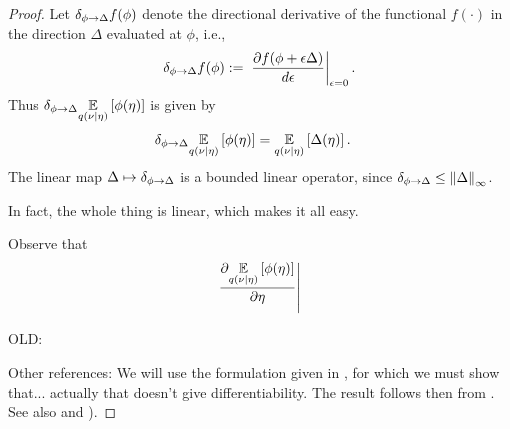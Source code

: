 \begin{thm}
\begin{proof}
Let $\delta_{\phi\rightarrow\Delta} f(\phi)$ denote the directional derivative of the functional
$f(\cdot)$ in the direction $\Delta$ evaluated at $\phi$, i.e.,
%
\begin{align*}
%
\dirderiv{\phi}{\Delta} f(\phi) :={}
\fracat{\partial f(\phi + \epsilon \Delta)}{d\epsilon}{\epsilon=0}.
%
\end{align*}
%
Thus $\delta_{\phi\rightarrow\Delta} \underset{q(\nu \vert \eta)}{\mathbb{E}}\left[\phi(\eta)\right]$
is given by
%
\begin{align*}
%
\dirderiv{\phi}{\Delta} \expect{\q(\nu \vert \eta)}{\phi(\eta)} ={}&
    \expect{\q(\nu \vert \eta)}{\Delta(\eta)}.
%
\end{align*}
%
The linear map $\Delta \mapsto \delta_{\phi\rightarrow\Delta}$ is a bounded
linear operator, since $\delta_{\phi\rightarrow\Delta} \le \left\Vert\Delta\right\Vert_{\infty}$.

In fact, the whole thing is linear, which makes it all easy.

Observe that
%
\begin{align*}
%
\fracat{\partial \expect{\q(\nu \vert \eta)}{\phi(\eta)}}{\partial \eta}{}
%
\end{align*}
%



OLD:

Other references: We will use the
formulation given in \citep[Theorem 3.4.10]{krantz:2012:implicit}, for which
we must show that... actually that doesn't give differentiability.
The result follows then from \citet[Proposition 4.8(c)]{zeidler:2013:functional}.
See also \citet[Corollary 1.4]{averbukh:1967:theory} and \citep[Appendix
A]{reeds:1976:thesis}).
%
\end{proof}
%
\end{thm}
%
